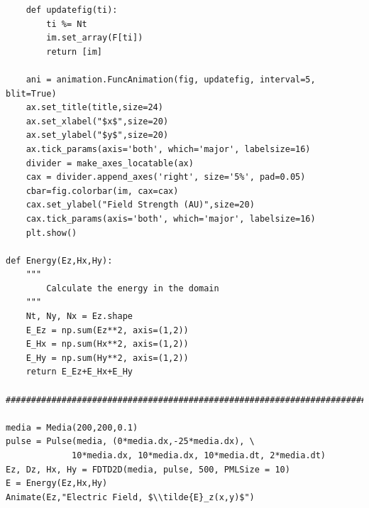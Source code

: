 \documentclass[12pt]{article}
\begin{document}
\begin{verbatim}
    def updatefig(ti):
        ti %= Nt
        im.set_array(F[ti])
        return [im]

    ani = animation.FuncAnimation(fig, updatefig, interval=5, blit=True)
    ax.set_title(title,size=24)
    ax.set_xlabel("$x$",size=20)
    ax.set_ylabel("$y$",size=20)
    ax.tick_params(axis='both', which='major', labelsize=16)
    divider = make_axes_locatable(ax)
    cax = divider.append_axes('right', size='5%', pad=0.05)
    cbar=fig.colorbar(im, cax=cax)
    cax.set_ylabel("Field Strength (AU)",size=20)
    cax.tick_params(axis='both', which='major', labelsize=16)
    plt.show()

def Energy(Ez,Hx,Hy):
    """
        Calculate the energy in the domain
    """
    Nt, Ny, Nx = Ez.shape
    E_Ez = np.sum(Ez**2, axis=(1,2))
    E_Hx = np.sum(Hx**2, axis=(1,2))
    E_Hy = np.sum(Hy**2, axis=(1,2))
    return E_Ez+E_Hx+E_Hy

###############################################################################

media = Media(200,200,0.1)
pulse = Pulse(media, (0*media.dx,-25*media.dx), \
             10*media.dx, 10*media.dx, 10*media.dt, 2*media.dt)
Ez, Dz, Hx, Hy = FDTD2D(media, pulse, 500, PMLSize = 10)
E = Energy(Ez,Hx,Hy)
Animate(Ez,"Electric Field, $\\tilde{E}_z(x,y)$")
\end{verbatim}
\end{document}

